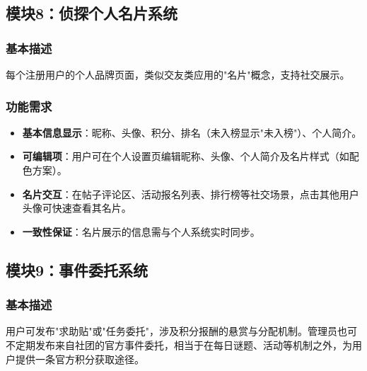 \documentclass[a4paper,12pt]{article}
\begin{document}
\subsection{模块8：侦探个人名片系统}
\subsubsection{基本描述}
每个注册用户的个人品牌页面，类似交友类应用的"名片"概念，支持社交展示。

\subsubsection{功能需求}
\begin{itemize}
    \item \textbf{基本信息显示}：昵称、头像、积分、排名（未入榜显示"未入榜"）、个人简介。
    \item \textbf{可编辑项}：用户可在个人设置页编辑昵称、头像、个人简介及名片样式（如配色方案）。
    \item \textbf{名片交互}：在帖子评论区、活动报名列表、排行榜等社交场景，点击其他用户头像可快速查看其名片。
    \item \textbf{一致性保证}：名片展示的信息需与个人系统实时同步。
\end{itemize}

\subsection{模块9：事件委托系统}
\subsubsection{基本描述}
用户可发布"求助贴"或"任务委托"，涉及积分报酬的悬赏与分配机制。管理员也可不定期发布来自社团的官方事件委托，相当于在每日谜题、活动等机制之外，为用户提供一条官方积分获取途径。
\end{document}
